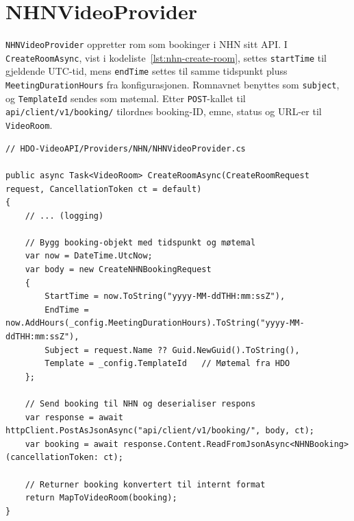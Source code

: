 \section{NHNVideoProvider}
\label{sec:NHN-provider}
\texttt{NHNVideoProvider} oppretter rom som bookinger i NHN sitt API. I \texttt{CreateRoomAsync}, vist i kodeliste~\ref{lst:nhn-create-room}, settes \texttt{startTime} til gjeldende UTC-tid, mens \texttt{endTime} settes til samme tidspunkt pluss \texttt{MeetingDurationHours} fra konfigurasjonen. Romnavnet benyttes som \texttt{subject}, og \texttt{TemplateId} sendes som møtemal. Etter \texttt{POST}-kallet til \texttt{api/client/v1/booking/} tilordnes booking-ID, emne, status og URL-er til \texttt{VideoRoom}.

\begin{lstlisting}[language={[Sharp]C}, label=lst:nhn-create-room, caption={Opprettelse av NHN Booking Request.}]
// HDO-VideoAPI/Providers/NHN/NHNVideoProvider.cs

public async Task<VideoRoom> CreateRoomAsync(CreateRoomRequest request, CancellationToken ct = default)
{
    // ... (logging)

    // Bygg booking-objekt med tidspunkt og møtemal
    var now = DateTime.UtcNow;
    var body = new CreateNHNBookingRequest
    {
        StartTime = now.ToString("yyyy-MM-ddTHH:mm:ssZ"),
        EndTime = now.AddHours(_config.MeetingDurationHours).ToString("yyyy-MM-ddTHH:mm:ssZ"),
        Subject = request.Name ?? Guid.NewGuid().ToString(),
        Template = _config.TemplateId   // Møtemal fra HDO
    };

    // Send booking til NHN og deserialiser respons
    var response = await httpClient.PostAsJsonAsync("api/client/v1/booking/", body, ct);
    var booking = await response.Content.ReadFromJsonAsync<NHNBooking>(cancellationToken: ct);

    // Returner booking konvertert til internt format
    return MapToVideoRoom(booking);
}
\end{lstlisting}


